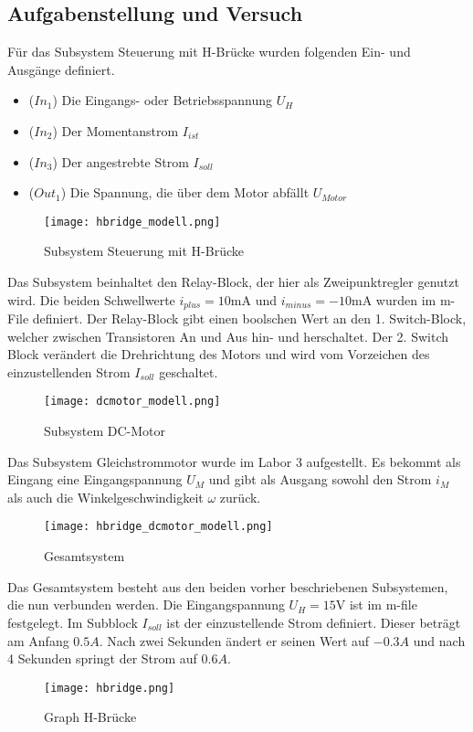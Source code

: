 \subsection{Aufgabenstellung und Versuch}

Für das Subsystem Steuerung mit H-Brücke wurden folgenden Ein- und Ausgänge
definiert.\\

\begin{itemize}
    \item ($In_1$) Die Eingangs- oder Betriebsspannung $U_H$
    \item ($In_2$) Der Momentanstrom $I_{ist}$
    \item ($In_3$) Der angestrebte Strom $I_{soll}$
    \item ($Out_1$) Die Spannung, die über dem Motor abfällt $U_{Motor}$
\end{itemize}


\begin{figure}[H]
    \centering
    \texttt{[image: hbridge\_modell.png]}
    \caption{Subsystem Steuerung mit H-Brücke}
    \label{fig:Subsystem H-Bridge}
\end{figure}

Das Subsystem beinhaltet den Relay-Block, der hier als Zweipunktregler genutzt
wird. Die beiden Schwellwerte $i_{plus}=10\mathrm{mA}$ und $i_{minus}=-10
\mathrm{mA}$ wurden im m-File definiert. Der Relay-Block gibt einen boolschen Wert
an den 1. Switch-Block, welcher zwischen Transistoren An und Aus hin- und
herschaltet. Der 2. Switch Block verändert die Drehrichtung des Motors und
wird vom Vorzeichen des einzustellenden Strom $I_{soll}$ geschaltet.

\begin{figure}[H]
    \centering
    \texttt{[image: dcmotor\_modell.png]}
    \caption{Subsystem DC-Motor}
    \label{fig:Subsystem DC-Motor}
\end{figure}

Das Subsystem Gleichstrommotor wurde im Labor 3 aufgestellt. Es bekommt
als Eingang eine Eingangspannung $U_M$ und gibt als Ausgang sowohl den
Strom $i_M$ als auch die Winkelgeschwindigkeit $\omega$ zurück.

\begin{figure}[H]
    \centering
    \texttt{[image: hbridge\_dcmotor\_modell.png]}
    \caption{Gesamtsystem}
    \label{fig:Gesamtsystem}
\end{figure}

Das Gesamtsystem besteht aus den beiden vorher beschriebenen Subsystemen, die nun
verbunden werden. Die Eingangspannung $U_H=15\mathrm{V}$ ist im m-file festgelegt.
Im Subblock $I_{soll}$ ist der einzustellende Strom definiert. Dieser beträgt
am Anfang $0.5A$. Nach zwei Sekunden ändert er seinen Wert auf $-0.3A$ und nach
4 Sekunden springt der Strom auf $0.6A$.

\begin{figure}[H]
    \centering
    \texttt{[image: hbridge.png]}
    \caption{Graph H-Brücke}
    \label{fig:Graph H-Bridge}
\end{figure}

